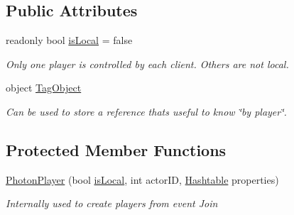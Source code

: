 \subsection*{Public Attributes}
\begin{DoxyCompactItemize}
\item 
readonly bool \hyperlink{class_photon_player_a7d51daf7a538dadae8339e95bf39e692}{is\+Local} = false
\begin{DoxyCompactList}\small\item\em Only one player is controlled by each client. Others are not local.\end{DoxyCompactList}\item 
object \hyperlink{class_photon_player_aaf54b32878a605d3e4d47f16ad106aa3}{Tag\+Object}
\begin{DoxyCompactList}\small\item\em Can be used to store a reference that\textquotesingle{}s useful to know \char`\"{}by player\char`\"{}. \end{DoxyCompactList}\end{DoxyCompactItemize}
\subsection*{Protected Member Functions}
\begin{DoxyCompactItemize}
\item 
\hyperlink{class_photon_player_a741e73c27e9c9f1f4afc9b95481e667d}{Photon\+Player} (bool \hyperlink{class_photon_player_a7d51daf7a538dadae8339e95bf39e692}{is\+Local}, int actor\+ID, \hyperlink{_extensions_8cs_afa613ef589c02dbd94acc273b62cdcfd}{Hashtable} properties)
\begin{DoxyCompactList}\small\item\em Internally used to create players from event Join \end{DoxyCompactList}\end{DoxyCompactItemize}
